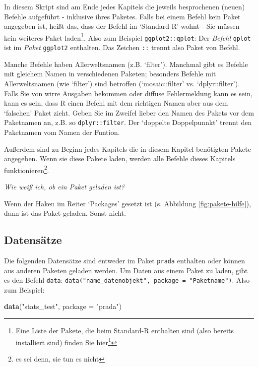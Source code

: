 \documentclass[12pt,ngerman,]{book}
\makeatletter
\newenvironment{Shaded}{\begin{snugshade}}{\end{snugshade}}
\newcommand{\KeywordTok}[1]{\textcolor[rgb]{0.13,0.29,0.53}{\textbf{#1}}}
\newcommand{\DataTypeTok}[1]{\textcolor[rgb]{0.13,0.29,0.53}{#1}}
\newcommand{\StringTok}[1]{\textcolor[rgb]{0.31,0.60,0.02}{#1}}
\newcommand{\NormalTok}[1]{#1}
\let\rmarkdownfootnote\footnote%
\def\footnote{\protect\rmarkdownfootnote}
\renewcommand{\href}[2]{#2\footnote{\url{#1}}}
\newenvironment{kframe}{%
\medskip{}
\setlength{\fboxsep}{.8em}
 \def\at@end@of@kframe{}%
 \ifinner\ifhmode%
  \def\at@end@of@kframe{\end{minipage}}%
  \begin{minipage}{\columnwidth}%
 \fi\fi%
 \def\FrameCommand##1{\hskip\@totalleftmargin \hskip-\fboxsep
 \colorbox{shadecolor}{##1}\hskip-\fboxsep
     \hskip-\linewidth \hskip-\@totalleftmargin \hskip\columnwidth}%
 \MakeFramed {\advance\hsize-\width
   \@totalleftmargin\z@ \linewidth\hsize
   \@setminipage}}%
 {\par\unskip\endMakeFramed%
 \at@end@of@kframe}
\renewenvironment{Shaded}{\begin{kframe}}{\end{kframe}}
\theoremstyle{definition}
\theoremstyle{definition}
\theoremstyle{remark}
\let\BeginKnitrBlock\begin \let\EndKnitrBlock\end
\makeatother
\begin{document}
In diesem Skript sind am Ende jedes Kapitels die jeweils besprochenen
(neuen) Befehle aufgeführt - inklusive ihres Paketes. Falls bei einem
Befehl kein Paket angegeben ist, heißt das, dass der Befehl im
`Standard-R' wohnt - Sie müssen kein weiteres Paket laden\footnote{Eine
  Liste der Pakete, die beim Standard-R enthalten sind (also bereits
  installiert sind) finden Sie
  \href{https://stat.ethz.ch/R-manual/R-devel/doc/html/packages.html}{hier}}.
Also zum Beispiel \texttt{ggplot2::qplot}: Der \emph{Befehl}
\texttt{qplot} ist im \emph{Paket} \texttt{ggplot2} enthalten. Das
Zeichen \texttt{::} trennt also Paket von Befehl.

\BeginKnitrBlock{rmdcaution}
Manche Befehle haben Allerweltsnamen (z.B. `filter'). Manchmal gibt es
Befehle mit gleichem Namen in verschiedenen Paketen; besonders Befehle
mit Allerweltsnamen (wie `filter') sind betroffen (`mosaic::filter' vs.
`dplyr::filter'). Falls Sie von wirre Ausgaben bekommen oder diffuse
Fehlermeldung kann es sein, kann es sein, dass R einen Befehl mit dem
richtigen Namen aber aus dem `falschen' Paket zieht. Geben Sie im
Zweifel lieber den Namen des Pakets vor dem Paketnamen an, z.B. so
\texttt{dplyr::filter}. Der `doppelte Doppelpunnkt' trennt den
Paketnamen vom Namen der Funtion.
\EndKnitrBlock{rmdcaution}

Außerdem sind zu Beginn jedes Kapitels die in diesem Kapitel benötigten
Pakete angegeben. Wenn sie diese Pakete laden, werden alle Befehle
dieses Kapitels funktionieren\footnote{es sei denn, sie tun es nicht}.

\emph{Wie weiß ich, ob ein Paket geladen ist?}

Wenn der Haken im Reiter `Packages' gesetzt ist (s. Abbildung
\ref{fig:pakete-hilfe}), dann ist das Paket geladen. Sonst nicht.

\subsection{Datensätze}\label{daten}

Die folgenden Datensätze sind entweder im Paket \texttt{prada} enthalten
oder können aus anderen Paketen geladen werden. Um Daten aus einem Paket
zu laden, gibt es den Befehl \texttt{data}:
\texttt{data("name\_datenobjekt",\ package\ =\ "Paketname")}. Also zum
Beispiel:

\begin{Shaded}
\begin{Highlighting}[]
\KeywordTok{data}\NormalTok{(}\StringTok{"stats_test"}\NormalTok{, }\DataTypeTok{package =} \StringTok{"prada"}\NormalTok{)}
\end{Highlighting}
\end{Shaded}
\end{document}
